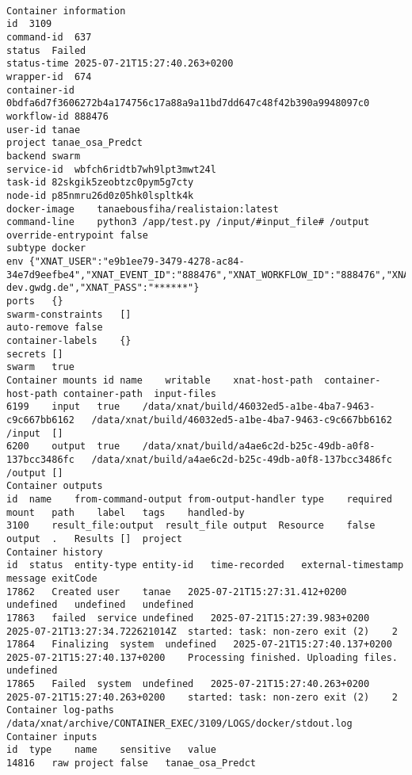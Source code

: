 \begin{lstlisting}

Container information
id	3109
command-id	637
status	Failed
status-time	2025-07-21T15:27:40.263+0200
wrapper-id	674
container-id	0bdfa6d7f3606272b4a174756c17a88a9a11bd7dd647c48f42b390a9948097c0
workflow-id	888476
user-id	tanae
project	tanae_osa_Predct
backend	swarm
service-id	wbfch6ridtb7wh9lpt3mwt24l
task-id	82skgik5zeobtzc0pym5g7cty
node-id	p85nmru26d0z05hk0lspltk4k
docker-image	tanaebousfiha/realistaion:latest
command-line	python3 /app/test.py /input/#input_file# /output
override-entrypoint	false
subtype	docker
env	{"XNAT_USER":"e9b1ee79-3479-4278-ac84-34e7d9eefbe4","XNAT_EVENT_ID":"888476","XNAT_WORKFLOW_ID":"888476","XNAT_HOST":"https://xnat-dev.gwdg.de","XNAT_PASS":"******"}
ports	{}
swarm-constraints	[]
auto-remove	false
container-labels	{}
secrets	[]
swarm	true
Container mounts id	name	writable	xnat-host-path	container-host-path	container-path	input-files
6199	input	true	/data/xnat/build/46032ed5-a1be-4ba7-9463-c9c667bb6162	/data/xnat/build/46032ed5-a1be-4ba7-9463-c9c667bb6162	/input	[]
6200	output	true	/data/xnat/build/a4ae6c2d-b25c-49db-a0f8-137bcc3486fc	/data/xnat/build/a4ae6c2d-b25c-49db-a0f8-137bcc3486fc	/output	[]
Container outputs
id	name	from-command-output	from-output-handler	type	required	mount	path	label	tags	handled-by
3100	result_file:output	result_file	output	Resource	false	output	.	Results	[]	project
Container history
id	status	entity-type	entity-id	time-recorded	external-timestamp	message	exitCode
17862	Created	user	tanae	2025-07-21T15:27:31.412+0200	undefined	undefined	undefined
17863	failed	service	undefined	2025-07-21T15:27:39.983+0200	2025-07-21T13:27:34.722621014Z	started: task: non-zero exit (2)	2
17864	Finalizing	system	undefined	2025-07-21T15:27:40.137+0200	2025-07-21T15:27:40.137+0200	Processing finished. Uploading files.	undefined
17865	Failed	system	undefined	2025-07-21T15:27:40.263+0200	2025-07-21T15:27:40.263+0200	started: task: non-zero exit (2)	2
Container log-paths
/data/xnat/archive/CONTAINER_EXEC/3109/LOGS/docker/stdout.log
Container inputs
id	type	name	sensitive	value
14816	raw	project	false	tanae_osa_Predct

\end{lstlisting}
